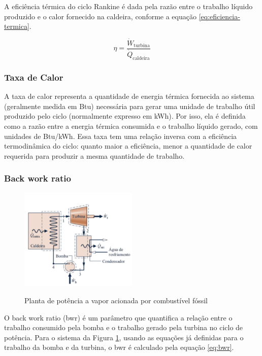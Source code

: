 \documentclass[
	article,			%
	11pt,				%
	oneside,			%
	a4paper,			%
	english,			%
	brazil,				%
	sumario=tradicional
	]{abntex2}
\begin{document}
A eficiência térmica do ciclo Rankine é dada pela razão entre o trabalho líquido produzido e o calor fornecido na caldeira, conforme a equação \ref{eq:eficiencia-termica}.

\begin{equation}
	\eta = \frac{\dot{W}_{\text{turbina}}}{\dot{Q}_{\text{caldeira}}}
	\label{eq:eficiencia-termica}
\end{equation}

\subsubsection{Taxa de Calor}

A taxa de calor representa a quantidade de energia térmica fornecida ao sistema (geralmente medida em Btu) necessária para gerar uma unidade de trabalho útil produzido pelo ciclo (normalmente expresso em kWh). Por isso, ela é definida como a razão entre a energia térmica consumida e o trabalho líquido gerado, com unidades de Btu/kWh. Essa taxa tem uma relação inversa com a eficiência termodinâmica do ciclo: quanto maior a eficiência, menor a quantidade de calor requerida para produzir a mesma quantidade de trabalho.

\subsubsection{Back work ratio}

\begin{figure}[h]
	\centering
	\includegraphics[width=0.5\textwidth]{./images/trabalho-realizado.png}
	\label{fig:trabalho-realizado}
	\caption{Planta de potência a vapor acionada por combustível fóssil}
\end{figure}

O back work ratio (bwr) é um parâmetro que quantifica a relação entre o trabalho consumido pela bomba e o trabalho gerado pela turbina no ciclo de potência. Para o sistema da Figura \ref{fig:trabalho-realizado}, usando as equações já definidas para o trabalho da bomba e da turbina, o bwr é calculado pela equação \ref{eq:bwr}.
\end{document}
